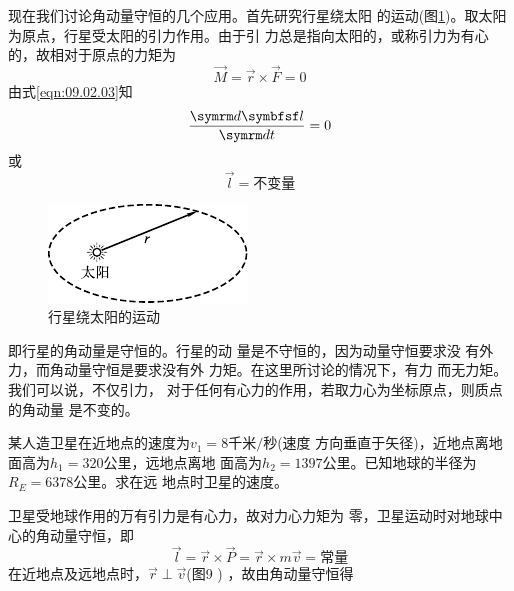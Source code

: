 现在我们讨论角动量守恒的几个应用。首先研究行星绕太阳
的运动(图\ref{fig:09.02})。取太阳为原点，行星受太阳的引力作用。由于引
力总是指向太阳的，或称引力为有心的，故相对于原点的力矩为
\begin{equation*}
  \vec{M} = \vec{r} \times \vec{F} = 0
\end{equation*}
由式\eqref{eqn:09.02.03}知
\begin{equation*}
  \frac { \dif \vec{l} } { \dif t } = 0
\end{equation*}
或
\begin{equation}\label{eqn:09.02.04}
  \vec{l} = \text{不变量}
\end{equation}
\begin{figure}
  \centering
  \includegraphics{figure/fig09.02}
  \caption{行星绕太阳的运动}
  \label{fig:09.02}
\end{figure}
即行星的角动量是守恒的。行星的动
量是不守恒的，因为动量守恒要求没
有外力，而角动量守恒是要求没有外
力矩。在这里所讨论的情况下，有力
而无力矩。我们可以说，不仅引力，
对于任何有心力的作用，若取力心为坐标原点，则质点的角动量
是不变的。

\example 某人造卫星在近地点的速度为$ v _ { 1 } = 8 \text{千米}/\text{秒}$(速度
方向垂直于矢径)，近地点离地面高为$ h _ { 1 } = 320 \text{公里} $，远地点离地
面高为$ h _ { 2 } = 1397 \text{公里} $。已知地球的半径为$ R _ { E } = 6378 \text{公里} $。求在远
地点时卫星的速度。

\solution 卫星受地球作用的万有引力是有心力，故对力心力矩为
零，卫星运动时对地球中心的角动量守恒，即
\begin{equation*}
  \vec{l} = \vec{r} \times \vec{P} = \vec{r} \times m \vec{v} = \text{常量}
\end{equation*}
在近地点及远地点时，$ \vec{r} \perp \vec{v} $(图9 ) ，故由角动量守恒得

